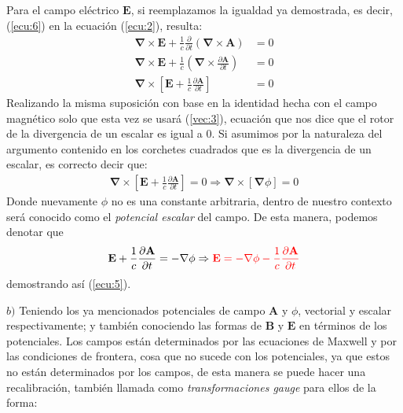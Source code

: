 \begin{multicols}{2}
Para el campo eléctrico $\mathbf{E}$, si reemplazamos la igualdad ya demostrada, es decir, (\ref{ecu:6}) en la ecuación (\ref{ecu:2}), resulta:
\begin{align*}
    \mathbf{\nabla} \times \mathbf{E} + \frac{1}{c} \frac{\partial}{\partial t}\left(\mathbf{\nabla} \times \mathbf{A}\right) &= 0\\
    \mathbf{\nabla} \times \mathbf{E} + \frac{1}{c} \left(\mathbf{\nabla} \times \frac{\partial \mathbf{A}}{\partial t}\right) &= 0\\
    \mathbf{\nabla} \times \left[\mathbf{E} + \frac{1}{c} \frac{\partial \mathbf{A}}{\partial t}\right] &= 0
\end{align*}
Realizando la misma suposición con base en la identidad hecha con el campo magnético solo que esta vez se usará (\ref{vec:3}), ecuación que nos dice que el rotor de la divergencia de un escalar es igual a 0. Si asumimos por la naturaleza del argumento contenido en los corchetes cuadrados que es la divergencia de un escalar, es correcto decir que:
\begin{align*}
    \mathbf{\nabla} \times \left[\mathbf{E} + \frac{1}{c} \frac{\partial \mathbf{A}}{\partial t}\right] = 0 \Rightarrow \mathbf{\nabla} \times \left[\mathbf{\nabla}\phi\right] = 0
\end{align*}
Donde nuevamente $\phi$ no es una constante arbitraria, dentro de nuestro contexto será conocido como el \textit{potencial escalar} del campo. De esta manera, podemos denotar que
\begin{align*}
    \mathbf{E} + \frac{1}{c} \frac{\partial \mathbf{A}}{\partial t} = -\mathbf{\nabla}\phi \Rightarrow \textcolor{rojo}{\mathbf{E} = -\mathbf{\nabla}\phi - \frac{1}{c} \frac{\partial \mathbf{A}}{\partial t}}
\end{align*}
demostrando así (\ref{ecu:5}).

$b)$ Teniendo los ya mencionados potenciales de campo $\mathbf{A}$ y $\phi$, vectorial y escalar respectivamente; y también conociendo las formas de $\mathbf{B}$ y $\mathbf{E}$ en términos de los potenciales. Los campos están determinados por las ecuaciones de Maxwell y por las condiciones de frontera, cosa que no sucede con los potenciales, ya que estos no están determinados por los campos, de esta manera se puede hacer una recalibración, también llamada como \textit{transformaciones gauge} para ellos de la forma:


\end{multicols}
